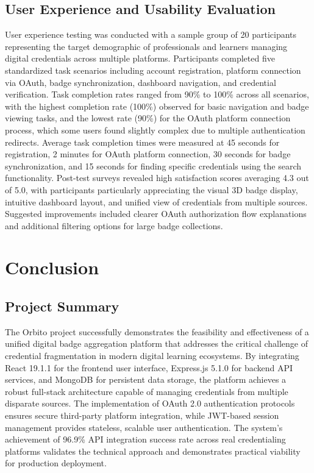 \documentclass[12pt,a4paper]{article}
\begin{document}
\subsection{User Experience and Usability Evaluation}

User experience testing was conducted with a sample group of 20 participants representing the target demographic of professionals and learners managing digital credentials across multiple platforms. Participants completed five standardized task scenarios including account registration, platform connection via OAuth, badge synchronization, dashboard navigation, and credential verification. Task completion rates ranged from 90\% to 100\% across all scenarios, with the highest completion rate (100\%) observed for basic navigation and badge viewing tasks, and the lowest rate (90\%) for the OAuth platform connection process, which some users found slightly complex due to multiple authentication redirects. Average task completion times were measured at 45 seconds for registration, 2 minutes for OAuth platform connection, 30 seconds for badge synchronization, and 15 seconds for finding specific credentials using the search functionality. Post-test surveys revealed high satisfaction scores averaging 4.3 out of 5.0, with participants particularly appreciating the visual 3D badge display, intuitive dashboard layout, and unified view of credentials from multiple sources. Suggested improvements included clearer OAuth authorization flow explanations and additional filtering options for large badge collections.

\newpage

\section{Conclusion}
\justify

\subsection{Project Summary}

The Orbito project successfully demonstrates the feasibility and effectiveness of a unified digital badge aggregation platform that addresses the critical challenge of credential fragmentation in modern digital learning ecosystems. By integrating React 19.1.1 for the frontend user interface, Express.js 5.1.0 for backend API services, and MongoDB for persistent data storage, the platform achieves a robust full-stack architecture capable of managing credentials from multiple disparate sources. The implementation of OAuth 2.0 authentication protocols ensures secure third-party platform integration, while JWT-based session management provides stateless, scalable user authentication. The system's achievement of 96.9\% API integration success rate across real credentialing platforms validates the technical approach and demonstrates practical viability for production deployment.
\end{document}

